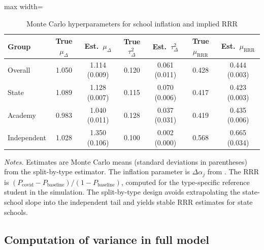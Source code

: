 \FloatBarrier
\begin{table}[!htbp]
\centering
\caption{Monte Carlo hyperparameters for school inflation and implied RRR}
\label{tab:mc_hyperparams_type}
\begin{adjustbox}{max width=\textwidth}
\begin{tabular}{lcccccc}
\toprule
Group & True $\mu_{\Delta}$ & Est.\ $\mu_{\Delta}$ & True $\tau^2_{\Delta}$ & Est.\ $\tau^2_{\Delta}$ & True $\mu_{\mathrm{RRR}}$ & Est.\ $\mu_{\mathrm{RRR}}$ \\
\midrule
Overall      & 1.050 & 1.114 (0.009) & 0.120 & 0.061 (0.011) & 0.428 & 0.444 (0.003) \\
State        & 1.089 & 1.128 (0.007) & 0.115 & 0.070 (0.006) & 0.417 & 0.423 (0.003) \\
Academy      & 0.983 & 1.040 (0.011) & 0.128 & 0.037 (0.031) & 0.419 & 0.435 (0.006) \\
Independent  & 1.028 & 1.350 (0.106) & 0.100 & 0.002 (0.000) & 0.568 & 0.665 (0.034) \\
\bottomrule
\end{tabular}
\end{adjustbox}
\vspace{0.5em}
\begin{minipage}{0.95\textwidth}
\footnotesize
\textit{Notes.} Estimates are Monte Carlo means (standard deviations in parentheses) from the split-by-type
estimator. The inflation parameter is $\Delta\alpha_j$ from . The RRR is
$(P_{\text{covid}} - P_{\text{baseline}}) / (1 - P_{\text{baseline}})$, computed for the type-specific
reference student in the simulation. The split-by-type design avoids extrapolating the state-school slope
into the independent tail and yields stable RRR estimates for state schools.
\end{minipage}
\end{table}
\FloatBarrier

\subsection{Computation of variance in full model}
